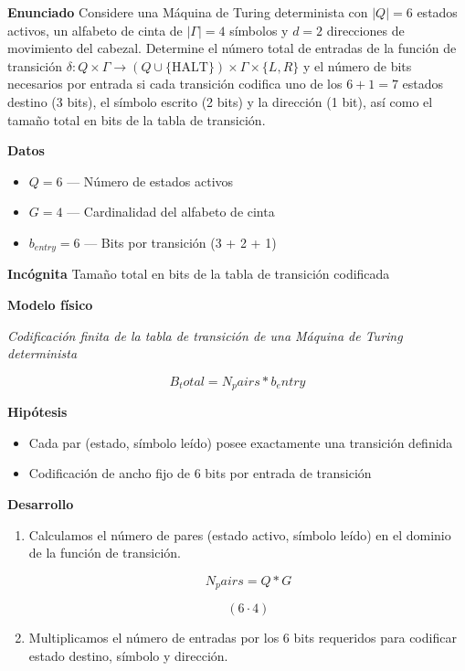 \documentclass{book}
\begin{document}
\begin{tcolorbox}[title={Problema resuelto}, studiumworked, breakable]

\noindent\textbf{Enunciado}
Considere una Máquina de Turing determinista con \(|Q| = 6\) estados activos, un alfabeto de cinta de \(|\Gamma| = 4\) símbolos y \(d = 2\) direcciones de movimiento del cabezal. Determine el número total de entradas de la función de transición \(\delta: Q \times \Gamma \to (Q \cup \{\text{HALT}\}) \times \Gamma \times \{L, R\}\) y el número de bits necesarios por entrada si cada transición codifica uno de los \(6 + 1 = 7\) estados destino (3 bits), el símbolo escrito (2 bits) y la dirección (1 bit), así como el tamaño total en bits de la tabla de transición.

\noindent\textbf{Datos}
\begin{itemize}
\item $Q = 6$ — Número de estados activos
\item $G = 4$ — Cardinalidad del alfabeto de cinta
\item $b_{entry} = 6$ — Bits por transición (3 + 2 + 1)
\end{itemize}

\noindent\textbf{Incógnita}
Tamaño total en bits de la tabla de transición codificada

\noindent\textbf{Modelo físico}

\noindent\textit{Codificación finita de la tabla de transición de una Máquina de Turing determinista}

\[
B_total = N_pairs * b_entry
\]

\noindent\textbf{Hipótesis}
\begin{itemize}
\item Cada par (estado, símbolo leído) posee exactamente una transición definida
\item Codificación de ancho fijo de 6 bits por entrada de transición
\end{itemize}

\noindent\textbf{Desarrollo}
\begin{enumerate}
\item
Calculamos el número de pares (estado activo, símbolo leído) en el dominio de la función de transición.

\[
N_pairs = Q * G
\]

\[
\left(6\cdot 4\right)
\]
\item
Multiplicamos el número de entradas por los 6 bits requeridos para codificar estado destino, símbolo y dirección.


\end{enumerate}
\end{tcolorbox}
\end{document}
